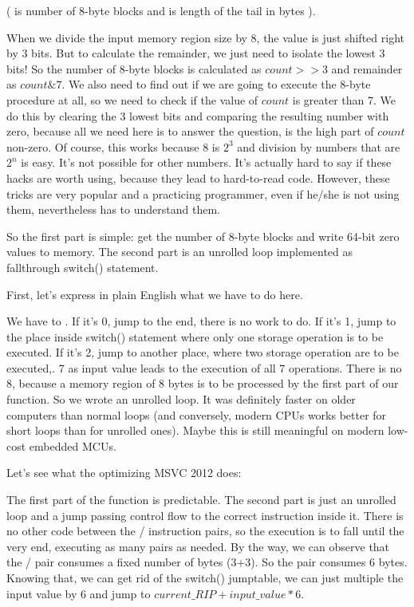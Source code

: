 (  is number of 8-byte blocks and  is length of the tail in bytes ).

When we divide the input memory region size by 8, the value is just shifted right by 3 bits.
But to calculate the remainder, we just need to isolate the lowest 3 bits!
So the number of 8-byte blocks is calculated as $count>>3$ and remainder as $count \& 7$.
We also need to find out if we are going to execute the 8-byte procedure at all, so we need
to check if the value of $count$ is greater than 7.
We do this by clearing the 3 lowest bits and comparing the resulting number with zero, because 
all we need here is to answer the question, is the high part of $count$ non-zero.
Of course, this works because 8 is $2^{3}$ and division by numbers that are $2^n$ is easy.
It's not possible for other numbers.
It's actually hard to say if these hacks are worth using, because they lead
to hard-to-read code.
However, these tricks are very popular and a practicing programmer, 
even if he/she is not using them, nevertheless has to understand them.

So the first part is simple: get the number of 8-byte blocks and write 64-bit zero values to memory.
The second part is an unrolled loop implemented as fallthrough switch() statement.

First, let's express in plain English what we have to do here.

We have to .
If it's 0, jump to the end, there is no work to do.
If it's 1, jump to the place inside switch() statement where only one storage operation
is to be executed.
If it's 2, jump to another place, where two storage operation are to be executed,\etc{}.
7 as input value leads to the execution of all 7 operations.
There is no 8, because a memory region of 8 bytes is to be processed by the first part of our function.
So we wrote an unrolled loop.
It was definitely faster on older computers than normal loops (and conversely,
modern CPUs works better for short loops than for unrolled ones).
Maybe this is still meaningful on modern low-cost embedded \ac{MCU}s.

Let's see what the optimizing MSVC 2012 does:



The first part of the function is predictable.
The second part is just an unrolled loop and a jump passing control flow to the correct instruction
inside it.
There is no other code between the / instruction pairs, 
so the execution is to fall until the very end, executing as many pairs as needed.
By the way, we can observe that the / pair consumes a fixed number of bytes (3+3).
So the pair consumes 6 bytes.
Knowing that, we can get rid of the switch() jumptable, we can just multiple the input value by 6
and jump to $current\_RIP + input\_value * 6$.

